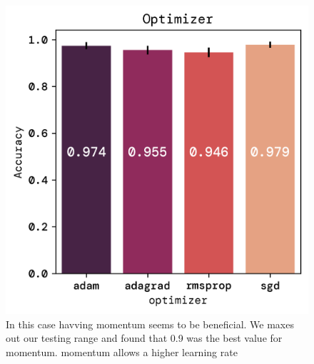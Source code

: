 \documentclass[twoside,11pt]{report}
\begin{document}
    \begin{figure}[!ht]
        \begin{minipage}[t]{0.5\textwidth - 1mm}
            \begin{center}
                \includegraphics[width=\textwidth]{../runsAndFigures/accuracy_optimizer.png}
            \end{center}
            \caption{In this case havving momentum seems to be beneficial. We maxes out our testing range and found that 0.9 was the best value for momentum. momentum allows a higher learning rate}\label{fig:accuracy_optimizer}
        \end{minipage}
        \hspace{2mm}
        \begin{minipage}[t]{0.5\textwidth - 1mm}
            \begin{center}

\end{center}
\end{minipage}
\end{figure}
\end{document}
